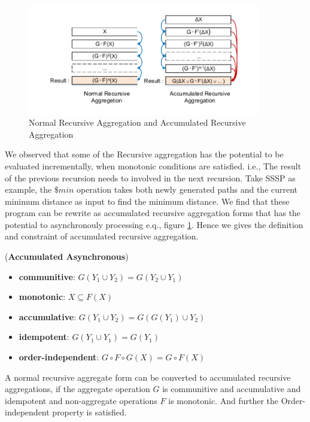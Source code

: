 {
	\begin{figure}[t]
		\vspace{-0.1in}
		\centerline{\includegraphics[width=4in]{fig/accumulative.pdf}}
		\caption{Normal Recursive Aggregation and Accumulated Recursive Aggregation }
		\vspace{-0.1in}
		\label{fig:arasssp}
	\end{figure}

We observed that some of the Recursive aggregation has the potential to be evaluated incrementally, when monotonic conditions are satisfied. i.e., The result of the previous recursion needs to involved in the next recursion. Take SSSP as example, the $\$min$ operation takes both newly generated paths and the current minimum distance as input to find the minimum distance. We find that these program can be rewrite as accumulated recursive aggregation forms that has the potential to asynchronouly processing e.q., figure \ref{fig:arasssp}. Hence we gives the definition and constraint of accumulated recursive aggregation.


\begin{definition}
	\label{th:monotone}
	(\textbf{Accumulated Asynchronous}) 
	\begin{itemize}
		\item \textbf{communitive}: $G(Y_1\cup Y_2)=G(Y_2\cup Y_1)$
		\item \textbf{monotonic}: $X\subseteq F(X)$
		\item \textbf{accumulative}: $G(Y_1\cup Y_2)=G(G(Y_1)\cup Y_2)$
		\item \textbf{idempotent}: $G(Y_1\cup Y_1)=G(Y_1)$
		\item \textbf{order-independent}: $G\circ F\circ G(X)=G\circ F(X)$
	\end{itemize}
	A normal recursive aggregate form can be converted to accumulated recursive aggregations, if the aggregate operation $G$ is communitive and accumulative and idempotent and non-aggregate operations $F$ is monotonic. And further the Order-independent property is satisfied.
\end{definition}
	
}
